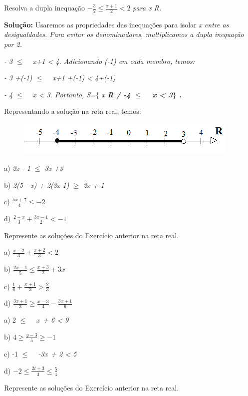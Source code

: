 \begin{texemplo}
Resolva a dupla inequação \( -\frac{3}{2} \leq \frac{x+1}{2}<2 \) \textit{ para x  R.}

\textbf{Solução:} Usaremos as propriedades das inequações para isolar \textit{x entre as desigualdades. Para evitar os denominadores, multiplicamos a dupla inequação por 2.}

\textit{- 3  $ \leq $  ~ x+1  <  4.  Adicionando (-1) em cada membro, temos:}

\textit{- 3 +(-1) $ \leq $  ~ x+1 +(-1) <  4+(-1)}

\textit{- 4  $ \leq $  ~ x  <  3. Portanto, S=$ \{ $ x  \textbf{R / -4  $ \leq $  ~ x  <  3$ \} $ . }}

Representando a solução na reta real, temos:

\begin{figure}[H]
		\includegraphics[width=4.2in,height=0.64in]{capitulos/inequacoes/media/image4.png}\qedsymbol{}
	\centering
\end{figure}
\end{texemplo}

\begin{exercicios}

	a) \textit{2x - 1 $ \leq $  3x +3 }

    b) \textit{2(5 - x) + 2(3x-1) $ \geq $  2x + 1 }
    
    c)  \( \frac{5x+7}{4} \leq -2 \)
    
    d) \( \frac{2-x}{3}+\frac{3x-1}{2}<-1 \)

	\item Represente as soluções do Exercício anterior na reta real.


	a) \( \frac{x-2}{3}+\frac{x+2}{3}<2 \)

    b) \( \frac{2x-1}{5} \leq \frac{x+3}{2}+3x \)
    
    c)  \( \frac{1}{6}+\frac{x+1}{3}>\frac{2}{3} \)
    
    d)  \( \frac{3x+1}{3} \geq \frac{x-3}{4}-\frac{3x+1}{6} \) 


	a) 2 \textit{$ \leq $ ~ x~+ 6  < 9}

    b)  \( 4 \geq \frac{y-3}{5} \geq -1 \)
    
    c) -1 \textit{$ \leq $ ~ -3x~+ 2  < 5}
    
    d)  \( -2 \leq \frac{2t+3}{3} \leq \frac{5}{4} \)

	\item Represente as soluções do Exercício anterior na reta real.
\end{exercicios}

